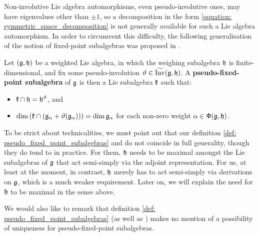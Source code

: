         Non-involutive Lie algebra automorphisms, even pseudo-involutive ones, may have eigenvalues other than $\pm 1$, so a decomposition in the form \eqref{equation: symmetric_space_decomposition} is not generally available for such a Lie algebra automorphism. In order to circumvent this difficulty, the following generalisation of the notion of fixed-point subalgebras was proposed in \cite[Definition 1.2]{regelskis_vlaar_kac_moody_pseudo_symmetric_pairs}. 
        \begin{definition} \label{def: pseudo_fixed_point_subalgebras}
            Let $(\mathfrak{g}, \mathfrak{h})$ be a weighted Lie algebra, in which the weighing subalgebra $\mathfrak{h}$ is finite-dimensional, and fix some pseudo-involution $\vartheta \in \widetilde{\operatorname{Inv}}(\mathfrak{g}, \mathfrak{h})$. A \textbf{pseudo-fixed-point subalgebra} of $\mathfrak{g}$ is then a Lie subalgebra $\mathfrak{k}$ such that:
            \begin{itemize}
                \item $\mathfrak{k} \cap \mathfrak{h} = \mathfrak{h}^{\vartheta}$, and
                \item $\dim\left( \mathfrak{k} \cap ( \mathfrak{g}_{\alpha} + \vartheta(\mathfrak{g}_{\alpha}) ) \right) = \dim \mathfrak{g}_{\alpha}$ for each non-zero weight $\alpha \in \mathsf{\Phi}(\mathfrak{g}, \mathfrak{h})$.
            \end{itemize}
        \end{definition}
        \begin{remark}
            To be strict about technicalities, we must point out that our definition \eqref{def: pseudo_fixed_point_subalgebras} and \cite[Definition 1.2]{regelskis_vlaar_kac_moody_pseudo_symmetric_pairs} do not coincide in full generality, though they do tend to in practice. For them, $\mathfrak{h}$ needs to be maximal amongst the Lie subalgebras of $\mathfrak{g}$ that act semi-simply via the adjoint representation. For us, at least at the moment, in contrast, $\mathfrak{h}$ merely has to act semi-simply via derivations on $\mathfrak{g}$, which is a much weaker requirement. Later on, we will explain the need for $\mathfrak{h}$ to be maximal in the sense above.
            
            We would also like to remark that definition \ref{def: pseudo_fixed_point_subalgebras} (as well as \cite[Definition 1.2]{regelskis_vlaar_kac_moody_pseudo_symmetric_pairs}) makes no mention of a possibility of uniqueness for pseudo-fixed-point subalgebras.
        \end{remark}

